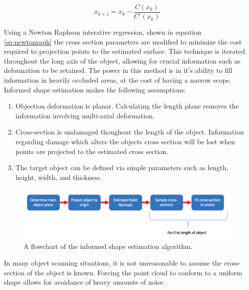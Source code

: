 \documentclass[12pt]{drexelthesis}
\begin{document}
\begin{equation}
	\label{eq:newtonraph}
	x_{k+1} = x_{k} - \frac{C(x_{k})}{C'(x_{k})}
\end{equation}

Using a Newton Raphson interative regression, shown in equation \ref{eq:newtonraph} the cross section parameters are modified to minimize the cost required to projection points to the estimated surface. This technique is iterated throughout the long axis of the object, allowing for crucial information such as deformation to be retained. The power in this method is in it's ability to fill information in heavily occluded areas, at the cost of having a narrow scope. Informed shape estimation makes the following assumptions:

\begin{enumerate}
	\item Objection deformation is planar. Calculating the length plane removes the information involving multi-axial deformation.
	\item Cross-section is undamaged thoughout the length of the object. Information regarding damage which alters the objects cross section will be lost when points are projected to the estimated cross section.
	\item The target object can be defined via simple parameters such as length, height, width, and thickness.
\end{enumerate}

\begin{figure}[!ht]
	\centering
		\includegraphics[width=5in]{cross-section-estimation/flowchart.png}
	\caption[Flow chart of informed shape estimation algorithm]{\centering A flowchart of the informed shape estimation algorithm.}
\end{figure}

In many object scanning situations, it is not unreasonable to assume the cross-section of the object is known. Forcing the point cloud to conform to a uniform shape allows for avoidance of heavy amounts of noise.
\end{document}
